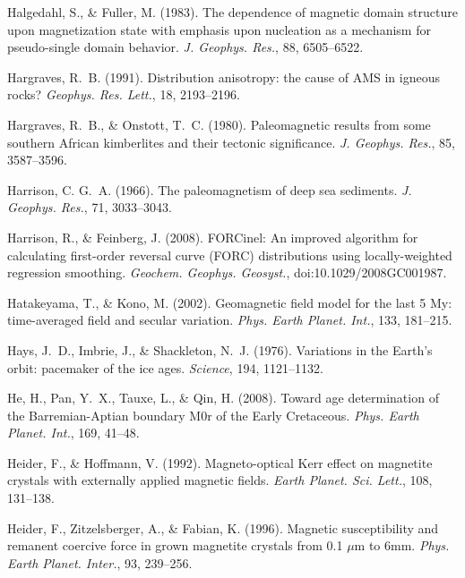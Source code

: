 \documentclass[,plain]{tauxe}
\begin{document}
\begin{thebibliography}{}
\bibitem{}%
Halgedahl, S., \& Fuller, M. (1983).
The dependence of magnetic domain structure upon magnetization state with emphasis upon nucleation as a mechanism for pseudo-single domain behavior.
{\it J. Geophys. Res.}, 88, 6505--6522.

\bibitem{}%
Hargraves, R.~B. (1991).
Distribution anisotropy: the cause of {AMS} in igneous rocks?
{\it Geophys. Res. Lett.}, 18, 2193--2196.

\bibitem{}%
Hargraves, R.~B., \& Onstott, T.~C. (1980).
Paleomagnetic results from some southern African kimberlites and their tectonic significance.
{\it J. Geophys. Res.}, 85, 3587--3596.

\bibitem{}%
Harrison, C. G.~A. (1966).
The paleomagnetism of deep sea sediments.
{\it J. Geophys. Res.}, 71, 3033--3043.

\bibitem{}%
Harrison, R., \& Feinberg, J. (2008).
FORCinel: An improved algorithm for calculating first-order reversal curve (FORC) distributions using locally-weighted regression smoothing.
{\it Geochem. Geophys. Geosyst.}, doi:10.1029/2008GC001987.

\bibitem{}%
Hatakeyama, T., \& Kono, M. (2002).
Geomagnetic field model for the last 5 My: time-averaged field and secular variation.
{\it Phys. Earth Planet. Int.}, 133, 181--215.

\bibitem{}%
Hays, J.~D., Imbrie, J., \& Shackleton, N.~J. (1976).
Variations in the Earth's orbit: pacemaker of the ice ages.
{\it Science}, 194, 1121--1132.

\bibitem{}%
He, H., Pan, Y.~X., Tauxe, L., \& Qin, H. (2008).
Toward age determination of the Barremian-Aptian boundary M0r of the Early Cretaceous.
{\it Phys. Earth Planet. Int.}, 169, 41--48.

\bibitem{}%
Heider, F., \& Hoffmann, V. (1992).
Magneto-optical Kerr effect on magnetite crystals with externally applied magnetic fields.
{\it Earth Planet. Sci. Lett.}, 108, 131--138.

\bibitem{}%
Heider, F., Zitzelsberger, A., \& Fabian, K. (1996).
Magnetic susceptibility and remanent coercive force in grown magnetite crystals from 0.1 $\mu$m to 6mm.
{\it Phys. Earth Planet. Inter.}, 93, 239--256.


\end{thebibliography}
\end{document}
